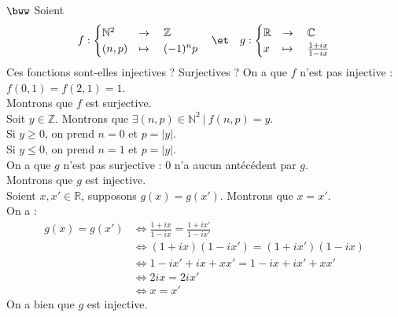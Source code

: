\documentclass[11pt]{article}
\begin{document}
\begin{exercice}{$\bww$}{}
    Soient
    \begin{equation*}
        f : \begin{cases}\mathbb{N}^2 &\to\quad \mathbb{Z} \\ (n,p) &\mapsto\quad (-1)^np \end{cases} \quad\et\quad g : \begin{cases}\mathbb{R} &\to\quad \mathbb{C} \\ x&\mapsto\quad \frac{1+ix}{1-ix} \end{cases}
    \end{equation*}
    Ces fonctions sont-elles injectives ? Surjectives ?
    \tcblower
    On a que $f$ n'est pas injective : $f(0,1) = f(2,1) = 1$.\\
    Montrons que $f$ est surjective.\\
    Soit $y\in\mathbb{Z}$. Montrons que $\exists (n,p)\in\mathbb{N}^2 ~ | ~ f(n,p) = y$.\\
    Si $y \geq 0$, on prend $n = 0$ et $p = |y|$.\\
    Si $y \leq 0$, on prend $n = 1$ et $p = |y|$.\\[0.2cm]
    On a que $g$ n'est pas surjective : $0$ n'a aucun antécédent par $g$.\\
    Montrons que $g$ est injective.\\
    Soient $x,x' \in \mathbb{R}$, supposons $g(x) = g(x')$. Montrons que $x=x'$.\\
    On a :
    \begin{align*}
        g(x) = g(x') &\iff \frac{1+ix}{1-ix} = \frac{1+ix'}{1-ix'}\\
        &\iff (1+ix)(1-ix') = (1+ix')(1-ix)\\
        &\iff 1 - ix' + ix + xx' = 1 - ix + ix' + xx'\\
        &\iff 2ix = 2ix'\\
        &\iff x = x' 
    \end{align*}
    On a bien que $g$ est injective.
\end{exercice}
\end{document}
